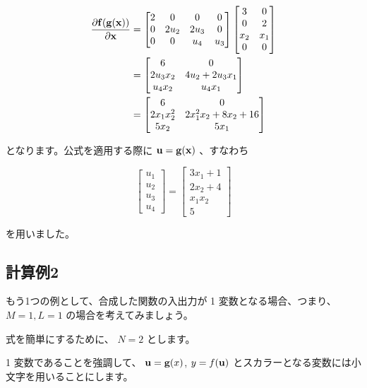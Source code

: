 \begin{align*}
\frac{\partial {\bf f}({\bf g}({\bf x}))}{\partial {\bf x}}
&=
\begin{bmatrix}
2 & 0 & 0 & 0\\
0 & 2u_2 & 2u_3 & 0 \\
0 & 0 & u_4 & u_3
\end{bmatrix}
\begin{bmatrix}
3 & 0 \\
0 & 2 \\
x_2 & x_1 \\
0 & 0
\end{bmatrix} \\
&=
\begin{bmatrix}
6 & 0 \\
2u_3x_2 & 4u_2 + 2u_3x_1 \\
u_4x_2 & u_4x_1
\end{bmatrix} \\
&=
\begin{bmatrix}
6 & 0 \\
2x_1x_2^2 & 2x_1^2x_2 + 8x_2 + 16 \\
5x_2 & 5x_1
\end{bmatrix}
\end{align*}


となります。公式を適用する際に ${\bf u} = {\bf g}(\bf x)$ 、すなわち


\[
\begin{bmatrix}
u_1 \\
u_2 \\
u_3 \\
u_4
\end{bmatrix} =
\begin{bmatrix}
3x_1 + 1 \\
2x_2 + 4 \\
x_1 x_2 \\
5
\end{bmatrix}
\]


を用いました。



\subsection{計算例2}


もう1つの例として、合成した関数の入出力が 1 変数となる場合、つまり、$M = 1, L = 1$ の場合を考えてみましょう。

式を簡単にするために、 $N = 2$ とします。

1 変数であることを強調して、 ${\bf u} = {\bf g}(x)$, $y = f({\bf u})$ とスカラーとなる変数には小文字を用いることにします。

